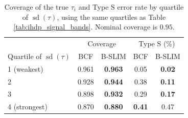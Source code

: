 \documentclass[12pt]{article}
\begin{document}
\begin{table}[H]
\centering\footnotesize
\caption{Individual CATE posteriors on IHDP (100 replicates, 10-fold out-of-sample,
$95\%$ credible intervals). Values are mean (standard error) over the 100 data sets, except AUC, which is averaged where both true effect signs occur.
``Excludes $0$'' is the fraction of children whose interval excludes zero.
``Sign correct'' and ``Type S'' are conditional on that. Coverage is of the true $\tau_i$
(nominal $0.95$). AUC is for $P(\tau_i>0)$ as a classifier of $\operatorname{sign}(\tau_i)$.}
\label{tab:ihdp_posterior}
\end{table}

\begin{table}[H]
\centering\small
\caption{Coverage of the true $\tau_i$ and Type S error rate by quartile of
$\operatorname{sd}(\tau)$, using the same quartiles as Table
\ref{tab:ihdp_signal_bands}. Nominal coverage is $0.95$.}
\label{tab:ihdp_posterior_bands}
\begin{tabular}{lcccc}
\toprule
& \multicolumn{2}{c}{Coverage} & \multicolumn{2}{c}{Type S (\%)}\\
\cmidrule(lr){2-3}\cmidrule(lr){4-5}
Quartile of $\operatorname{sd}(\tau)$ & BCF & B-SLIM & BCF & B-SLIM\\
\midrule
1 (weakest) & 0.961 & \textbf{0.963} & 0.05 & \textbf{0.02}\\
2 & 0.928 & \textbf{0.944} & 0.38 & \textbf{0.11}\\
3 & 0.898 & \textbf{0.932} & 0.29 & \textbf{0.17}\\
4 (strongest) & 0.870 & \textbf{0.880} & \textbf{0.41} & 0.47\\
\bottomrule
\end{tabular}
\end{table}

\end{document}
